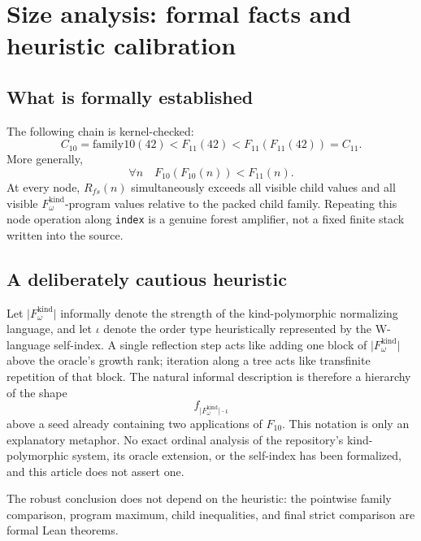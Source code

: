 \documentclass[11pt]{article}
\theoremstyle{definition}
\theoremstyle{remark}
\newcommand{\Cten}{C_{10}}
\newcommand{\Celeven}{C_{11}}
\newcommand{\Fk}{\ensuremath{F_{\omega}^{\mathrm{kind}}}}
\newcommand{\lean}[1]{\texttt{#1}}
\begin{document}
\section{Size analysis: formal facts and heuristic calibration}

\subsection{What is formally established}

The following chain is kernel-checked:
\[
  \Cten
  =\mathrm{family10}(42)
  <F_{11}(42)
  <F_{11}(F_{11}(42))
  =\Celeven.
\]
More generally,
\[
  \forall n\quad F_{10}(F_{10}(n))<F_{11}(n).
\]
At every node, $R_{fs}(n)$ simultaneously exceeds all visible child values and
all visible \Fk-program values relative to the packed child family.  Repeating
this node operation along \lean{index} is a genuine forest amplifier, not a
fixed finite stack written into the source.

\subsection{A deliberately cautious heuristic}

Let $\lvert\Fk\rvert$ informally denote the strength of the kind-polymorphic
normalizing language, and let $\iota$ denote the order type heuristically
represented by the W-language self-index.  A single reflection step acts like
adding one block of $\lvert\Fk\rvert$ above the oracle's growth rank; iteration
along a tree acts like transfinite repetition of that block.  The natural
informal description is therefore a hierarchy of the shape
\[
  f_{\lvert\Fk\rvert\cdot\iota}
\]
above a seed already containing two applications of $F_{10}$.  This notation is
only an explanatory metaphor.  No exact ordinal analysis of the repository's
kind-polymorphic system, its oracle extension, or the self-index has been
formalized, and this article does not assert one.

The robust conclusion does not depend on the heuristic: the pointwise family
comparison, program maximum, child inequalities, and final strict comparison
are formal Lean theorems.
\end{document}
